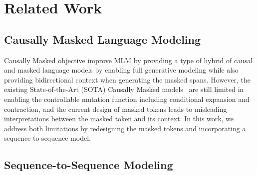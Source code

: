 \section{Related Work}\label{sec:related}










\subsection{Causally Masked Language Modeling}

Causally Masked objective improve MLM by providing a type of hybrid of causal and masked language models by enabling full generative modeling while also providing bidirectional context when generating the masked spans. 
However, the existing State-of-the-Art (SOTA) Causally Masked models~\citep{aghajanyan2022cm3} are still limited in enabling the controllable mutation function including conditional expansion and contraction, and the current design of masked tokens leads to misleading interpretations between the masked token and its context. In this work, we address both limitations by redesigning the masked tokens and incorporating a sequence-to-sequence model.

\subsection{Sequence-to-Sequence Modeling }

